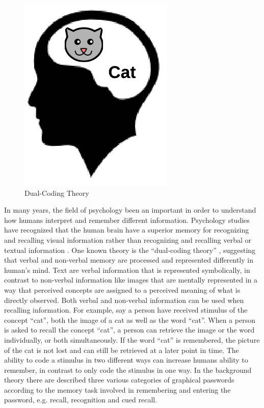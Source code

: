   \begin{figure}
    \vspace{-20pt}
    \begin{center}
      \includegraphics[scale=0.35]{pics/dualCoding.png}
    \end{center}
    \vspace{-20pt}
    \caption{Dual-Coding Theory}
    \vspace{-10pt}
  \end{figure}

  In many years, the field of psychology been an important in order to understand how humans interpret and remember different information. Psychology studies have recognized that the human brain have a superior memory for recognizing and recalling visual information rather than recognizing and recalling verbal or textual information \cite{DeAngeli}. One known theory is the ``dual-coding theory'' \cite{Biddle}, suggesting that verbal and non-verbal memory are processed and represented differently in human's mind. Text are verbal information that is represented symbolically, in contrast to non-verbal information like images that are mentally represented in a way that perceived concepts are assigned to a perceived meaning of what is directly observed. Both verbal and non-verbal information can be used when recalling information. For example, say a person have received stimulus of the concept ``cat'', both the image of a cat as well as the word ``cat''. When a person is asked to recall the concept ``cat'', a person can retrieve the image or the word individually, or both simultaneously. If the word ``cat'' is remembered, the picture of the cat is not lost and can still be retrieved at a later point in time. The ability to code a stimulus in two different ways can increase humans ability to remember, in contrast to only code the stimulus in one way. In the background theory there are described three various categories of graphical passwords according to the memory task involved in remembering and entering the password, e.g. recall, recognition and cued recall.

